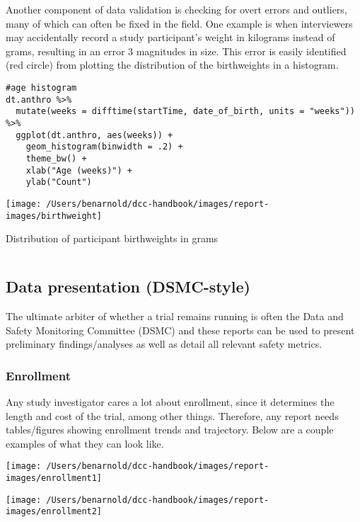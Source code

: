 \documentclass[
]{book}
\begin{document}
Another component of data validation is checking for overt errors and outliers, many of which can often be fixed in the field. One example is when interviewers may accidentally record a study participant's weight in kilograms instead of grams, resulting in an error 3 magnitudes in size. This error is easily identified (red circle) from plotting the distribution of the birthweights in a histogram.

\begin{verbatim}
#age histogram
dt.anthro %>%
  mutate(weeks = difftime(startTime, date_of_birth, units = "weeks")) %>%
  ggplot(dt.anthro, aes(weeks)) +
    geom_histogram(binwidth = .2) +
    theme_bw() +
    xlab("Age (weeks)") +
    ylab("Count")
\end{verbatim}

\texttt{[image: /Users/benarnold/dcc-handbook/images/report-images/birthweight]}

Distribution of participant birthweights in grams

\(~\)

\hypertarget{data-presentation-dsmc-style}{%
\subsection{Data presentation (DSMC-style)}\label{data-presentation-dsmc-style}}

The ultimate arbiter of whether a trial remains running is often the Data and Safety Monitoring Committee (DSMC) and these reports can be used to present preliminary findings/analyses as well as detail all relevant safety metrics.

\hypertarget{enrollment}{%
\subsubsection{Enrollment}\label{enrollment}}

Any study investigator cares a lot about enrollment, since it determines the length and cost of the trial, among other things. Therefore, any report needs tables/figures showing enrollment trends and trajectory. Below are a couple examples of what they can look like.

\texttt{[image: /Users/benarnold/dcc-handbook/images/report-images/enrollment1]}

\texttt{[image: /Users/benarnold/dcc-handbook/images/report-images/enrollment2]}
\end{document}
